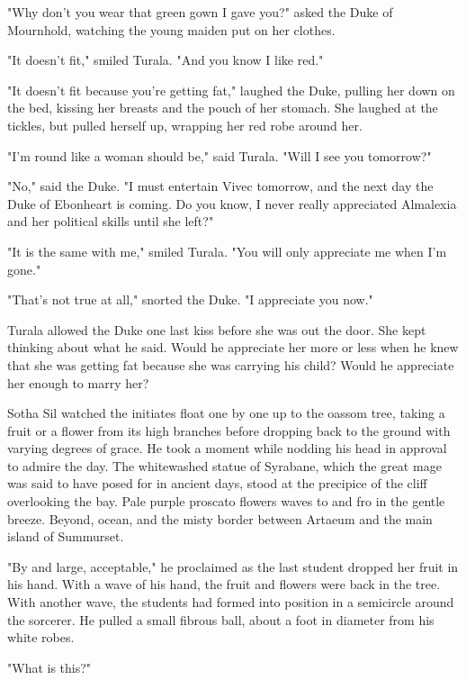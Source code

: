 "Why don't you wear that green gown I gave you?" asked the Duke of Mournhold, watching the young maiden put on her clothes.

"It doesn't fit," smiled Turala. "And you know I like red."

"It doesn't fit because you're getting fat," laughed the Duke, pulling her down on the bed, kissing her breasts and the pouch of her stomach. She laughed at the tickles, but pulled herself up, wrapping her red robe around her.

"I'm round like a woman should be," said Turala. "Will I see you tomorrow?"

"No," said the Duke. "I must entertain Vivec tomorrow, and the next day the Duke of Ebonheart is coming. Do you know, I never really appreciated Almalexia and her political skills until she left?"

"It is the same with me," smiled Turala. "You will only appreciate me when I'm gone."

"That's not true at all," snorted the Duke. "I appreciate you now."

Turala allowed the Duke one last kiss before she was out the door. She kept thinking about what he said. Would he appreciate her more or less when he knew that she was getting fat because she was carrying his child? Would he appreciate her enough to marry her?

Sotha Sil watched the initiates float one by one up to the oassom tree, taking a fruit or a flower from its high branches before dropping back to the ground with varying degrees of grace. He took a moment while nodding his head in approval to admire the day. The whitewashed statue of Syrabane, which the great mage was said to have posed for in ancient days, stood at the precipice of the cliff overlooking the bay. Pale purple proscato flowers waves to and fro in the gentle breeze. Beyond, ocean, and the misty border between Artaeum and the main island of Summurset.

"By and large, acceptable," he proclaimed as the last student dropped her fruit in his hand. With a wave of his hand, the fruit and flowers were back in the tree. With another wave, the students had formed into position in a semicircle around the sorcerer. He pulled a small fibrous ball, about a foot in diameter from his white robes.

"What is this?"


